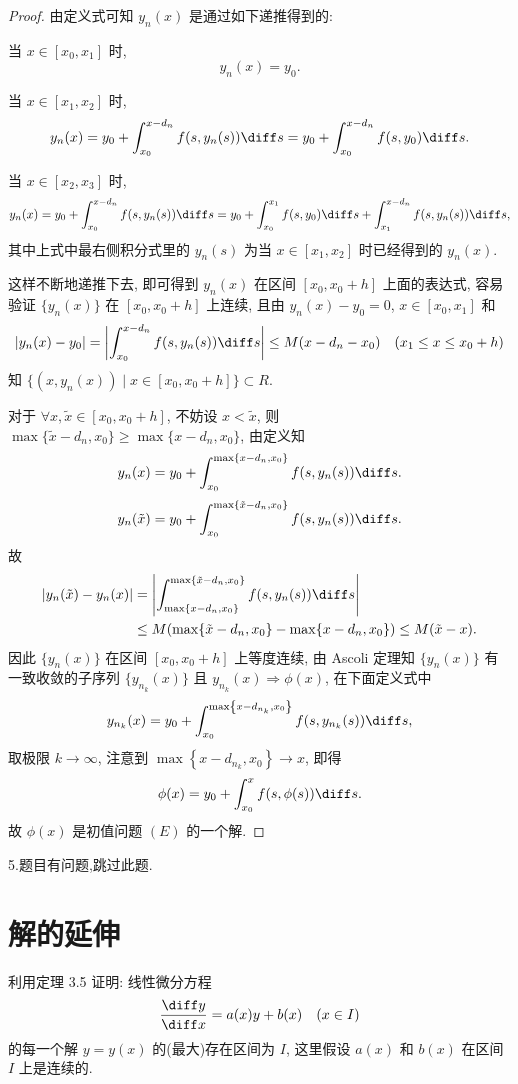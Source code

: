 \begin{proof}
  由定义式可知 $y_n(x)$ 是通过如下递推得到的:

  当 $x\in[x_0,x_1]$ 时,
  \[y_n(x)=y_0.\]

  当 $x\in[x_1,x_2]$ 时,
  \[y_n(x)=y_0+\int_{x_0}^{x-d_n}f(s,y_n(s))\diff s=y_0+\int_{x_0}^{x-d_n}f(s,y_0)\diff s.\]

  当 $x\in[x_2,x_3]$ 时,
  \[y_n(x)=y_0+\int_{x_0}^{x-d_n}f(s,y_n(s))\diff s=y_0+\int_{x_0}^{x_1}f(s,y_0)\diff s+\int_{x_1}^{x-d_n}f(s,y_n(s))\diff s,\]
  其中上式中最右侧积分式里的 $y_n(s)$ 为当 $x\in[x_1,x_2]$ 时已经得到的 $y_n(x)$.

  这样不断地递推下去, 即可得到 $y_n(x)$ 在区间 $[x_0,x_0+h]$ 上面的表达式,
  容易验证 $\{y_n(x)\}$ 在 $[x_0,x_0+h]$ 上连续, 且由 $y_n(x)-y_0=0$, $x\in[x_0,x_1]$ 和
  \[|y_n(x)-y_0|=\biggl|\int_{x_0}^{x-d_n}f(s,y_n(s))\diff s\biggr|\leq M(x-d_n-x_0)
    \quad (x_1\leq x\leq x_0+h)\]
  知 $\{(x,y_n(x))\mid x\in[x_0,x_0+h]\}\subset R$.

  对于 $\forall x,\tilde{x}\in[x_0,x_0+h]$, 不妨设 $x<\tilde{x}$,
  则 $\max\{\tilde{x}-d_n,x_0\}\geq\max\{x-d_n,x_0\}$, 由定义知
  \[y_n(x)=y_0+\int_{x_0}^{\max\{x-d_n,x_0\}}f(s,y_n(s))\diff s.\]
  \[y_n(\tilde{x})=y_0+\int_{x_0}^{\max\{\tilde{x}-d_n,x_0\}}f(s,y_n(s))\diff s.\]
  故
  \[\begin{split}
    |y_n(\tilde{x})-y_n(x)|
    & = \left|\int_{\max\{x-d_n,x_0\}}^{\max\{\tilde{x}-d_n,x_0\}}f(s,y_n(s))\diff s\right|\\
    & \leq M(\max\{\tilde{x}-d_n,x_0\}-\max\{x-d_n,x_0\})\leq M(\tilde{x}-x).
  \end{split}\]
  因此 $\{y_n(x)\}$ 在区间 $[x_0,x_0+h]$ 上等度连续,
  由 Ascoli 定理知 $\{y_n(x)\}$ 有一致收敛的子序列
  $\{y_{n_k}(x)\}$ 且 $y_{n_k}(x)\Rightarrow\phi(x)$, 在下面定义式中
  \[y_{n_k}(x)=y_0+\int_{x_0}^{\max\left\{x-d_{n_k},x_0\right\}}f(s,y_{n_k}(s))\diff s,\]
  取极限 $k\to\infty$, 注意到 $\max\left\{x-d_{n_k},x_0\right\}\to x$, 即得
  \[\phi(x)=y_0+\int_{x_0}^xf(s,\phi(s))\diff s.\]
  故 $\phi(x)$ 是初值问题 $(E)$ 的一个解.
\end{proof}


5.题目有问题,跳过此题.



\section{解的延伸}



\begin{exercise}
  利用定理 3.5 证明: 线性微分方程
  \[\frac{\diff y}{\diff x}=a(x)y+b(x)\quad (x\in I)\]
  的每一个解 $y=y(x)$ 的(最大)存在区间为 $I$, 这里假设 $a(x)$ 和 $b(x)$ 在区间 $I$ 上是连续的.
\end{exercise}

